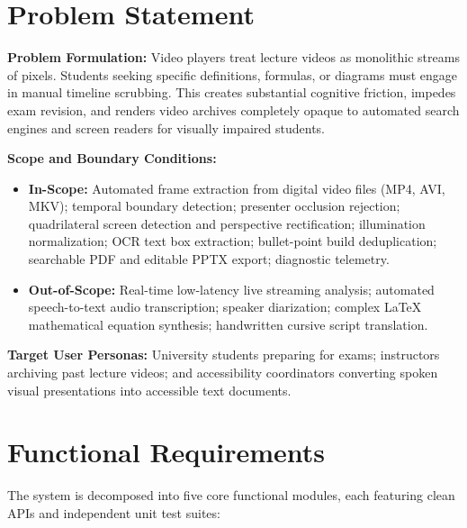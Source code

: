 \documentclass[10pt,a4paper]{article}
\begin{document}
\section{Problem Statement}

\textbf{Problem Formulation:} Video players treat lecture videos as monolithic streams of pixels. Students seeking specific definitions, formulas, or diagrams must engage in manual timeline scrubbing. This creates substantial cognitive friction, impedes exam revision, and renders video archives completely opaque to automated search engines and screen readers for visually impaired students.

\textbf{Scope and Boundary Conditions:}
\begin{itemize}[leftmargin=6mm, itemsep=1pt, topsep=2pt]
  \item \textbf{In-Scope:} Automated frame extraction from digital video files (MP4, AVI, MKV); temporal boundary detection; presenter occlusion rejection; quadrilateral screen detection and perspective rectification; illumination normalization; OCR text box extraction; bullet-point build deduplication; searchable PDF and editable PPTX export; diagnostic telemetry.
  \item \textbf{Out-of-Scope:} Real-time low-latency live streaming analysis; automated speech-to-text audio transcription; speaker diarization; complex LaTeX mathematical equation synthesis; handwritten cursive script translation.
\end{itemize}

\textbf{Target User Personas:} University students preparing for exams; instructors archiving past lecture videos; and accessibility coordinators converting spoken visual presentations into accessible text documents.

\section{Functional Requirements}

The system is decomposed into five core functional modules, each featuring clean APIs and independent unit test suites:
\end{document}

